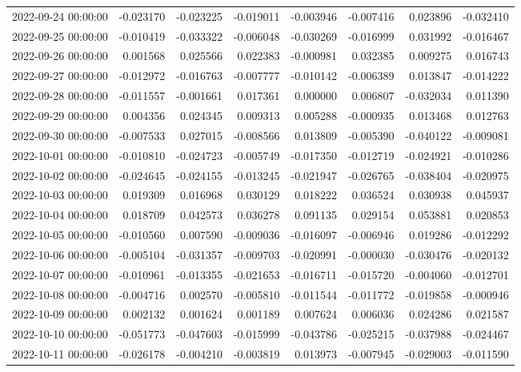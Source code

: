 \begin{tabular}{lrrrrrrr}
2022-09-24 00:00:00 & -0.023170 & -0.023225 & -0.019011 & -0.003946 & -0.007416 & 0.023896 & -0.032410 \\
2022-09-25 00:00:00 & -0.010419 & -0.033322 & -0.006048 & -0.030269 & -0.016999 & 0.031992 & -0.016467 \\
2022-09-26 00:00:00 & 0.001568 & 0.025566 & 0.022383 & -0.000981 & 0.032385 & 0.009275 & 0.016743 \\
2022-09-27 00:00:00 & -0.012972 & -0.016763 & -0.007777 & -0.010142 & -0.006389 & 0.013847 & -0.014222 \\
2022-09-28 00:00:00 & -0.011557 & -0.001661 & 0.017361 & 0.000000 & 0.006807 & -0.032034 & 0.011390 \\
2022-09-29 00:00:00 & 0.004356 & 0.024345 & 0.009313 & 0.005288 & -0.000935 & 0.013468 & 0.012763 \\
2022-09-30 00:00:00 & -0.007533 & 0.027015 & -0.008566 & 0.013809 & -0.005390 & -0.040122 & -0.009081 \\
2022-10-01 00:00:00 & -0.010810 & -0.024723 & -0.005749 & -0.017350 & -0.012719 & -0.024921 & -0.010286 \\
2022-10-02 00:00:00 & -0.024645 & -0.024155 & -0.013245 & -0.021947 & -0.026765 & -0.038404 & -0.020975 \\
2022-10-03 00:00:00 & 0.019309 & 0.016968 & 0.030129 & 0.018222 & 0.036524 & 0.030938 & 0.045937 \\
2022-10-04 00:00:00 & 0.018709 & 0.042573 & 0.036278 & 0.091135 & 0.029154 & 0.053881 & 0.020853 \\
2022-10-05 00:00:00 & -0.010560 & 0.007590 & -0.009036 & -0.016097 & -0.006946 & 0.019286 & -0.012292 \\
2022-10-06 00:00:00 & -0.005104 & -0.031357 & -0.009703 & -0.020991 & -0.000030 & -0.030476 & -0.020132 \\
2022-10-07 00:00:00 & -0.010961 & -0.013355 & -0.021653 & -0.016711 & -0.015720 & -0.004060 & -0.012701 \\
2022-10-08 00:00:00 & -0.004716 & 0.002570 & -0.005810 & -0.011544 & -0.011772 & -0.019858 & -0.000946 \\
2022-10-09 00:00:00 & 0.002132 & 0.001624 & 0.001189 & 0.007624 & 0.006036 & 0.024286 & 0.021587 \\
2022-10-10 00:00:00 & -0.051773 & -0.047603 & -0.015999 & -0.043786 & -0.025215 & -0.037988 & -0.024467 \\
2022-10-11 00:00:00 & -0.026178 & -0.004210 & -0.003819 & 0.013973 & -0.007945 & -0.029003 & -0.011590 \\

\end{tabular}
